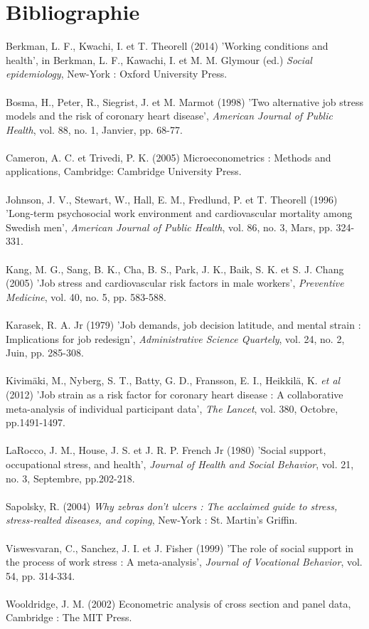 \documentclass[a4paper, oneside, titlepage]{article}
\begin{document}
\section{Bibliographie}
\noindent Berkman, L. F., Kwachi, I. et T. Theorell (2014) 'Working conditions and health', in Berkman, L. F., Kawachi, I. et M. M. Glymour (ed.) \textit{Social epidemiology}, New-York : Oxford University Press. \\
\\
Bosma, H., Peter, R., Siegrist, J. et M. Marmot (1998) 'Two alternative job stress models and the risk of coronary heart disease', \textit{American Journal of Public Health}, vol. 88, no. 1, Janvier, pp. 68-77. \\
\\
Cameron, A. C. et Trivedi, P. K. (2005) Microeconometrics : Methods and applications, Cambridge: Cambridge University Press. \\
\\
Johnson, J. V., Stewart, W., Hall, E. M., Fredlund, P. et T. Theorell (1996) 'Long-term psychosocial work environment and cardiovascular mortality among Swedish men', \textit{American Journal of Public Health}, vol. 86, no. 3, Mars, pp. 324-331. \\
\\
Kang, M. G., Sang, B. K., Cha, B. S., Park, J. K., Baik, S. K. et S. J. Chang (2005) 'Job stress and cardiovascular risk factors in male workers', \textit{Preventive Medicine}, vol. 40, no. 5, pp. 583-588. \\
\\
Karasek, R. A. Jr (1979) 'Job demands, job decision latitude, and mental strain : Implications for job redesign', \textit{Administrative Science Quartely}, vol. 24, no. 2, Juin, pp. 285-308. \\
\\
Kivimäki, M., Nyberg, S. T., Batty, G. D., Fransson, E. I., Heikkilä, K. \textit{et al} (2012) 'Job strain as a risk factor for coronary heart disease : A collaborative meta-analysis of individual participant data', \textit{The Lancet}, vol. 380, Octobre, pp.1491-1497. \\
\\
LaRocco, J. M., House, J. S. et J. R. P. French Jr (1980) 'Social support, occupational stress, and health', \textit{Journal of Health and Social Behavior}, vol. 21, no. 3, Septembre, pp.202-218. \\
\\
Sapolsky, R. (2004) \textit{Why zebras don't ulcers : The acclaimed guide to stress, stress-realted diseases, and coping}, New-York : St. Martin's Griffin. \\
\\
Viswesvaran, C., Sanchez, J. I. et J. Fisher (1999) 'The role of social support in the process of work stress : A meta-analysis', \textit{Journal of Vocational Behavior}, vol. 54, pp. 314-334. \\
\\
Wooldridge, J. M. (2002) Econometric analysis of cross section and panel data, Cambridge : The MIT Press. \\
\end{document}
